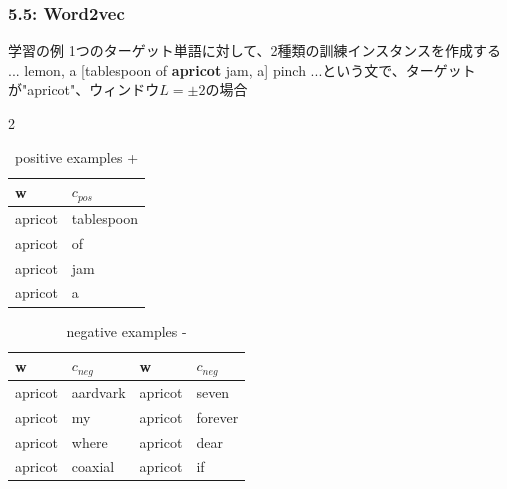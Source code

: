 \documentclass[unicode,11pt]{beamer} %
\begin{document}
\begin{frame}
    \frametitle{5.5: Word2vec}
    \begin{exampleblock}{学習の例}
        1つのターゲット単語に対して、2種類の訓練インスタンスを作成する
        \\... lemon, a [tablespoon of \textbf{apricot} jam, a] pinch ...という文で、ターゲットが"apricot"、ウィンドウ$L= \pm 2$の場合
    \end{exampleblock}
    \begin{multicols}{2}
        \centering
        \begin{table}
            \centering
            \caption{positive examples +}
            \begin{tabular}{ll}
                w&$c_{pos}$\\
                \hline
                apricot&tablespoon\\
                apricot&of\\
                apricot&jam\\
                apricot&a\\
            \end{tabular}
        \end{table}
        \begin{table}
            \centering
            \caption{negative examples -}
            \begin{tabular}{llll}
                w&$c_{neg}$&w&$c_{neg}$\\
                \hline
                apricot&aardvark&apricot&seven\\
                apricot&my&apricot&forever\\
                apricot&where&apricot&dear\\
                apricot&coaxial&apricot&if\\
            \end{tabular}
        \end{table}
    \end{multicols}
\end{frame}
\end{document}
